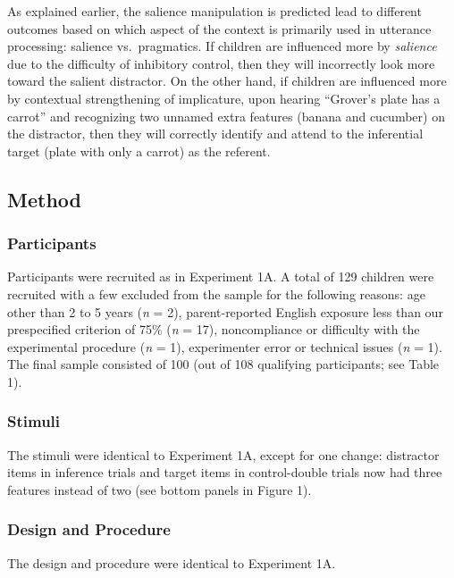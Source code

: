 \documentclass[a4paper,man,apacite,floatsintext]{apa6}
\begin{document}
As explained earlier, the salience manipulation is predicted lead to
different outcomes based on which aspect of the context is primarily
used in utterance processing: salience vs.~pragmatics. If children are
influenced more by \emph{salience} due to the difficulty of inhibitory
control, then they will incorrectly look more toward the salient
distractor. On the other hand, if children are influenced more by
contextual strengthening of implicature, upon hearing ``Grover's plate
has a carrot'' and recognizing two unnamed extra features (banana and
cucumber) on the distractor, then they will correctly identify and
attend to the inferential target (plate with only a carrot) as the
referent.

\subsection{Method}\label{method-1}

\subsubsection{Participants}\label{participants-1}

Participants were recruited as in Experiment 1A. A total of 129 children
were recruited with a few excluded from the sample for the following
reasons: age other than 2 to 5 years (\emph{n} = 2), parent-reported
English exposure less than our prespecified criterion of 75\% (\emph{n}
= 17), noncompliance or difficulty with the experimental procedure
(\emph{n} = 1), experimenter error or technical issues (\emph{n} = 1).
The final sample consisted of 100 (out of 108 qualifying participants;
see Table 1).

\subsubsection{Stimuli}\label{stimuli}

The stimuli were identical to Experiment 1A, except for one change:
distractor items in inference trials and target items in control-double
trials now had three features instead of two (see bottom panels in
Figure 1).

\subsubsection{Design and Procedure}\label{design-and-procedure}

The design and procedure were identical to Experiment 1A.
\end{document}
